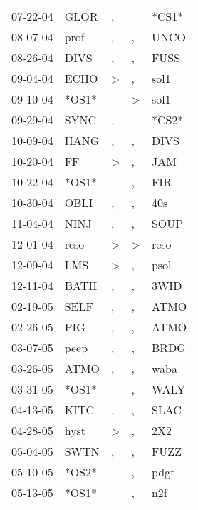 \begin{supertabular}{lllll}
 07-22-04 &   GLOR &                , &                  &  *CS1* \\
 08-07-04 &   prof &                , &                , &   UNCO \\
 08-26-04 &   DIVS &                , &                , &   FUSS \\
 09-04-04 &   ECHO &     \textgreater &                , &   sol1 \\
 09-10-04 &  *OS1* &                  &     \textgreater &   sol1 \\
 09-29-04 &   SYNC &                , &                  &  *CS2* \\
 10-09-04 &   HANG &                , &                , &   DIVS \\
 10-20-04 &     FF &     \textgreater &                , &    JAM \\
 10-22-04 &  *OS1* &                  &                , &    FIR \\
 10-30-04 &   OBLI &                , &                , &    40s \\
 11-04-04 &   NINJ &                , &                , &   SOUP \\
 12-01-04 &   reso &     \textgreater &     \textgreater &   reso \\
 12-09-04 &    LMS &     \textgreater &                , &   psol \\
 12-11-04 &   BATH &                , &                , &   3WID \\
 02-19-05 &   SELF &                , &                , &   ATMO \\
 02-26-05 &    PIG &                , &                , &   ATMO \\
 03-07-05 &   peep &                , &                , &   BRDG \\
 03-26-05 &   ATMO &                , &                , &   waba \\
 03-31-05 &  *OS1* &                  &                , &   WALY \\
 04-13-05 &   KITC &                , &                , &   SLAC \\
 04-28-05 &   hyst &     \textgreater &                , &    2X2 \\
 05-04-05 &   SWTN &                , &                , &   FUZZ \\
 05-10-05 &  *OS2* &                  &                , &   pdgt \\
 05-13-05 &  *OS1* &                  &                , &    n2f \\

\end{supertabular}
